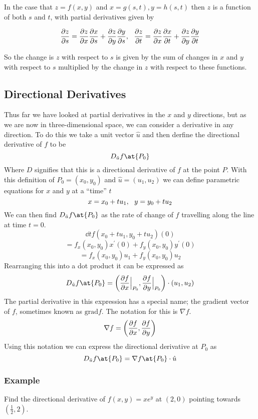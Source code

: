 \documentclass[12pt]{report}
\begin{document}
\begin{flushleft}
\bigskip

In the case that \(z = f(x, y)\) and \(x = g(s, t), y = h(s, t)\) then \(z\) is
a function of both \(s\) and \(t\), with partial derivatives given by

\[\frac{\partial z}{\partial s} = \frac{\partial z}{\partial x}\frac{\partial x}{\partial s} + \frac{\partial z}{\partial y}\frac{\partial y}{\partial s}, \:\:\:
\frac{\partial z}{\partial t} = \frac{\partial z}{\partial x}\frac{\partial x}{\partial t} + \frac{\partial z}{\partial y}\frac{\partial y}{\partial t}\]

So the change is \(z\) with respect to \(s\) is given by the sum of changes in
\(x\) and \(y\) with respect to \(s\) multiplied by the change in \(z\) with
respect to these functions.

\subsection*{Directional Derivatives}

Thus far we have looked at partial derivatives in the \(x\) and \(y\)
directions, but as we are now in three-dimensional space, we can consider a
derivative in any direction. To do this we take a unit vector \(\hat{u}\) and
then derfine the directional derivative of \(f\) to be
\[D_{\hat{u}}f\at{P_0}\]
Where \(D\) signifies that this is a directional derivative of \(f\) at the
point \(P\). With this definition of \(P_0 = (x_0, y_0)\) and
\(\hat{u} = (u_1, u_2)\) we can define parametric equations for \(x\) and \(y\)
at a ``time'' \(t\)
\[x = x_0 + tu_1, \:\:\: y = y_0 + tu_2\]
We can then find \(D_{\hat{u}}f\at{P_0}\) as the rate of change of \(f\)
travelling along the line at time \(t = 0\).
\[\dd{}{t}f(x_0 + tu_1, y_0 + tu_2)(0)\]
\[= f_x(x_0, y_0)x^\prime(0) + f_y(x_0, y_0)y^\prime(0)\]
\[= f_x(x_0, y_0)u_1 + f_y(x_0, y_0)u_2\]
Rearranging this into a dot product it can be expressed as
\[D_{\hat{u}}f\at{P_0} = \left(\ddelat{f}{x}{P_0}, \ddelat{f}{y}{P_0}\right)
\cdot(u_1, u_2)\]
The partial derivative in this expression has a special name; the gradient
vector of \(f\), sometimes known as \(\mathrm{grad}f\). The notation for this
is \(\nabla f\).
\[\nabla f = \left(\frac{\partial f}{\partial x}, \frac{\partial f}{\partial y}\right)\]
Using this notation we can express the directional derivative at \(P_0\) as
\[D_{\hat{u}}f\at{P_0} = \nabla f\at{P_0}\cdot\hat{u}\]

\subsubsection*{Example}

Find the directional derivative of \(f(x, y) = xe^y\) at \((2, 0)\) pointing
towards \(\left(\frac{1}{2}, 2\right)\).


\end{flushleft}
\end{document}
